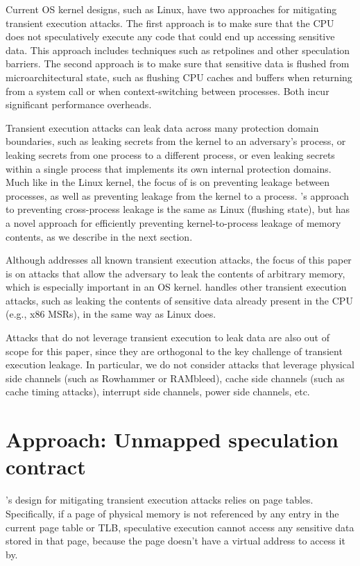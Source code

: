 Current OS kernel designs, such as Linux, have two approaches for
mitigating transient execution attacks.  The first approach is to make
sure that the CPU does not speculatively execute any code that could
end up accessing sensitive data.  This approach includes techniques such
as retpolines and other speculation barriers.  The second approach is to
make sure that sensitive data is flushed from microarchitectural state,
such as flushing CPU caches and buffers when returning from a system
call or when context-switching between processes.  Both incur significant
performance overheads.

Transient execution attacks can leak data across many protection domain
boundaries, such as leaking secrets from the kernel to an adversary's
process, or leaking secrets from one process to a different process,
or even leaking secrets within a single process that implements its
own internal protection domains.  Much like in the Linux kernel, the
focus of \sys is on preventing leakage between processes, as well as
preventing leakage from the kernel to a process.  \sys's approach to
preventing cross-process leakage is the same as Linux (flushing state),
but \sys has a novel approach for efficiently preventing kernel-to-process
leakage of memory contents, as we describe in the next section.

Although \sys addresses all known transient execution attacks, the focus
of this paper is on attacks that allow the adversary to leak the contents
of arbitrary memory, which is especially important in an OS kernel.
\sys handles other transient execution attacks, such as leaking the
contents of sensitive data already present in the CPU (e.g., x86 MSRs),
in the same way as Linux does.

Attacks that do not leverage transient execution to leak data are also
out of scope for this paper, since they are orthogonal to the key
challenge of transient execution leakage.  In particular, we do not
consider attacks that leverage physical side channels (such
as Rowhammer or RAMbleed), cache side channels (such as cache timing
attacks), interrupt side channels, power side channels, etc.

\section{Approach: Unmapped speculation contract}

\sys's design for mitigating transient execution attacks relies
on page tables.  Specifically, if a page of physical
memory is not referenced by any entry in the current page table or
TLB, speculative execution cannot access any sensitive data stored in
that page, because the page doesn't have a virtual address to access
it by.

